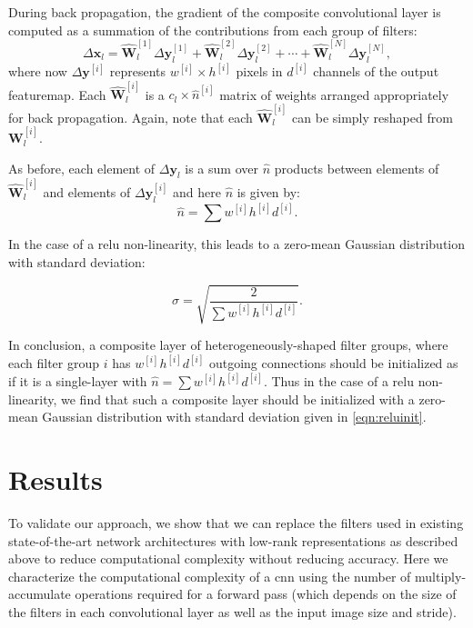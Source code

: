 \documentclass[thesis]{subfiles}
\begin{document}
    During back propagation, the gradient of the composite convolutional layer is computed as a summation of the contributions from each group of filters:
    \begin{equation}
    \Delta \mathbf{x}_l = \hat{\mathbf{W}}_l^{[1]} \Delta \mathbf{y}_l^{[1]} +  \hat{\mathbf{W}}_l^{[2]} \Delta \mathbf{y}_l^{[2]} + \cdots+  \hat{\mathbf{W}}_l^{[N]} \Delta \mathbf{y}_l^{[N]},
    \label{eq:back_prop_gradient_composite}
    \end{equation}
    where now $\Delta \mathbf{y}^{[i]}$ represents $w^{[i]} \times h^{[i]}$ pixels in $d^{[i]}$ channels of the output \gls{featuremap}. Each $\hat{\mathbf{W}}_l^{[i]}$ is a $c_l \times \hat{n}^{[i]}$ matrix of weights arranged appropriately for back propagation. Again, note that each $\hat{\mathbf{W}}_l^{[i]}$ can be simply reshaped from $\mathbf{W}_l^{[i]}$.
    
    As before, each element of $\Delta \mathbf{y}_l$ is a sum over $\hat n$ products between elements of $\hat{\mathbf{W}}^{[i]}_l$ and elements of $\Delta \mathbf{y}^{[i]}_l$ and here $\hat{n}$ is given by:
    \begin{equation}
    \hat{n} = \sum{ w^{[i]} h^{[i]} d^{[i]}}.
    \end{equation}
    
    In the case of a \gls{relu} non-linearity, this leads to a zero-mean Gaussian distribution with standard deviation:
    
    \begin{equation}
    \sigma = \sqrt{\frac{2}{\sum{ w^{[i]} h^{[i]} d^{[i]}}}}.\label{eqn:reluinit}
    \end{equation}
    
    In conclusion, a composite layer of heterogeneously-shaped filter groups, where each filter group $i$ has $w^{[i]} h^{[i]} d^{[i]}$ outgoing connections should be initialized as if it is a single-layer with  $\hat{n} = \sum{ w^{[i]} h^{[i]} d^{[i]}}$. Thus in the case of a \gls{relu} non-linearity, we find that such a composite layer should be initialized with a zero-mean Gaussian distribution with standard deviation given in \cref{eqn:reluinit}.
    
    \section{Results}
    To validate our approach, we show that we can replace the filters used in existing state-of-the-art network architectures with low-rank representations as described above to reduce computational complexity without reducing accuracy. Here we characterize the computational complexity of a \gls{cnn} using the number of multiply-accumulate operations required for a forward pass (which depends on the size of the filters in each convolutional layer as well as the input image size and stride).
\end{document}

